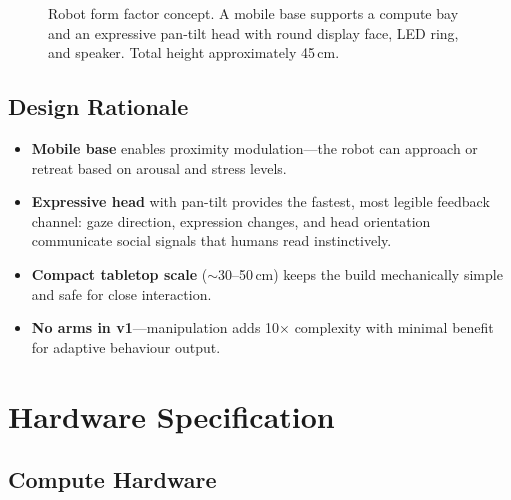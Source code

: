 \documentclass[11pt,a4paper]{article}
\begin{document}
\begin{figure}[H]
\caption{Robot form factor concept. A mobile base supports a compute bay and an expressive pan-tilt head with round display face, LED ring, and speaker. Total height approximately 45\,cm.}
\label{fig:robot-form}
\end{figure}

\subsection{Design Rationale}

\begin{itemize}[leftmargin=1.5em]
  \item \textbf{Mobile base} enables proximity modulation---the robot can approach or retreat based on arousal and stress levels.
  \item \textbf{Expressive head} with pan-tilt provides the fastest, most legible feedback channel: gaze direction, expression changes, and head orientation communicate social signals that humans read instinctively.
  \item \textbf{Compact tabletop scale} ($\sim$30--50\,cm) keeps the build mechanically simple and safe for close interaction.
  \item \textbf{No arms in v1}---manipulation adds 10$\times$ complexity with minimal benefit for adaptive behaviour output.
\end{itemize}


\section{Hardware Specification}
\label{sec:hardware}

\subsection{Compute Hardware}
\end{document}
